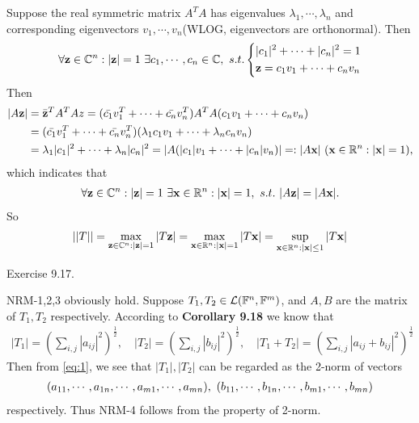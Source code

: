 \documentclass{homework}
\begin{document}
	Suppose the real symmetric matrix $A^TA$ has eigenvalues $\lambda_1, \cdots,\lambda_n$ and corresponding eigenvectors $v_1,\cdots, v_n$(WLOG, eigenvectors are orthonormal). Then 
	\begin{eqnarray}
		\forall\textbf{z}\in\mathbb{C}^n:|\textbf{z}|=1\ \exists c_1,\cdots,c_n\in\mathbb{C},\ s.t. 
		\left\{
			\begin{aligned}
				&|c_1|^2 + \cdots + |c_n|^2 = 1 \\
				&\textbf{z} = c_1v_1 + \cdots + c_nv_n
			\end{aligned}
		\right.
	\end{eqnarray}
	Then
	\begin{eqnarray}
		\begin{aligned}
			|A\textbf{z}| &= \bar{\textbf{z}}^T A^T A z = (\bar{c_1}v_1^T + \cdots + \bar{c_n}v_n^T ) A^TA(c_1v_1 + \cdots + c_nv_n)\\
			&= (\bar{c_1}v_1^T + \cdots + \bar{c_n}v_n^T )(\lambda_1 c_1v_1 + \cdots + \lambda_nc_nv_n)\\
			&= \lambda_1|c_1|^2+\cdots+\lambda_n|c_n|^2
			= |A(|c_1|v_1+ \cdots +|c_n|v_n)| =: |A\textbf{x}|\ (\textbf{x}\in\mathbb{R}^n: |\textbf{x}|=1),
		\end{aligned}
	\end{eqnarray}
	which indicates that
	\begin{eqnarray}
		\forall \bz\in\CC^n: |\bz|=1\ \exists \bx \in\RR^n:|\bx|=1,\ s.t.\ |A\bz| = |A\bx|.
	\end{eqnarray}
	So 
	\begin{eqnarray}
		||T|| = \max_{\textbf{z}\in\mathbb{C}^n:|\textbf{z}|=1} |T\textbf{z}| = \max_{\textbf{x}\in\mathbb{R}^n:|\textbf{x}|=1} |T\textbf{x}| = \sup_{\textbf{x}\in\mathbb{R}^n:|\textbf{x}|\leq1} |T\textbf{x}|
	\end{eqnarray}
	
\question Exercise 9.17.
	
	NRM-1,2,3 obviously hold. Suppose $T_1,T_2\in\mathcal{L}(\mathbb{F}^n, \mathbb{F}^m)$, and $A, B$ are the matrix of $T_1,T_2$ respectively. According to \textbf{Corollary 9.18} we know that 
	\begin{eqnarray}\label{eq:1}
		|T_1| = (\sum_{i,j}|a_{ij}|^2)^{\frac{1}{2}},\quad |T_2| = (\sum_{i,j}|b_{ij}|^2)^{\frac{1}{2}},\quad 
		|T_1+T_2| = (\sum_{i,j}|a_{ij}+b_{ij}|^2)^{\frac{1}{2}}
	\end{eqnarray}
	Then from \ref{eq:1}, we see that $|T_1|, |T_2|$ can be regarded as the 2-norm of vectors
	\begin{eqnarray}
		\begin{aligned}
			(a_{11},\cd,a_{1n},\cd,a_{m1},\cd,a_{mn}),\ (b_{11},\cd,b_{1n},\cd,b_{m1},\cd,b_{mn})
		\end{aligned}
	\end{eqnarray}
	respectively. Thus NRM-4 follows from the property of 2-norm.
\end{document}
